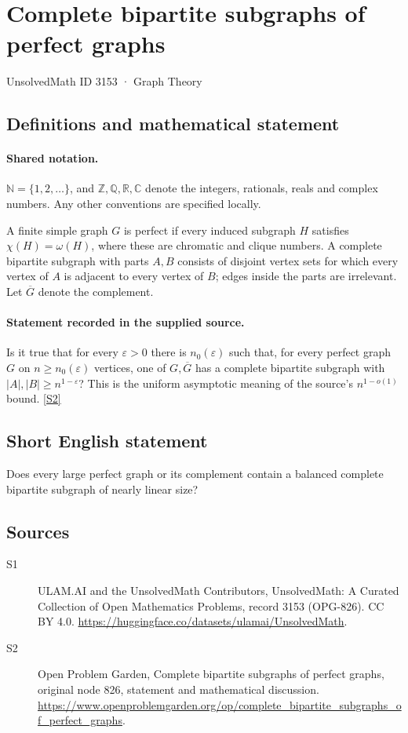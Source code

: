 \documentclass[11pt]{article}
\newcommand{\sref}[2]{\hyperlink{source:#1:#2}{[S#2]}}
\begin{document}
\setcounter{section}{3152}
\section{Complete bipartite subgraphs of perfect graphs}\label{3153}
{\small\sffamily UnsolvedMath ID 3153 · Graph Theory}
\subsection{Definitions and mathematical statement}

\paragraph{Shared notation.}$\mathbb N=\{1,2,\ldots\}$, and $\mathbb Z,\mathbb Q,\mathbb R,\mathbb C$ denote the integers, rationals, reals and complex numbers. Any other conventions are specified locally.


A finite simple graph $G$ is perfect if every induced subgraph $H$ satisfies $\chi(H)=\omega(H)$, where these are chromatic and clique numbers. A complete bipartite subgraph with parts $A,B$ consists of disjoint vertex sets for which every vertex of $A$ is adjacent to every vertex of $B$; edges inside the parts are irrelevant. Let $\overline G$ denote the complement.
\paragraph{Statement recorded in the supplied source.}
Is it true that for every $\varepsilon>0$ there is $n_0(\varepsilon)$ such that, for every perfect graph $G$ on $n\ge n_0(\varepsilon)$ vertices, one of $G,\overline G$ has a complete bipartite subgraph with $|A|,|B|\ge n^{1-\varepsilon}$? This is the uniform asymptotic meaning of the source's $n^{1-o(1)}$ bound. \sref{3153}{2}
\subsection{Short English statement}
Does every large perfect graph or its complement contain a balanced complete bipartite subgraph of nearly linear size?
\subsection{Sources}
\begin{description}
\item[\hypertarget{source:3153:1}{S1}] ULAM.AI and the UnsolvedMath Contributors, UnsolvedMath: A Curated Collection of Open Mathematics Problems, record 3153 (OPG-826). CC BY 4.0. \url{https://huggingface.co/datasets/ulamai/UnsolvedMath}.
\item[\hypertarget{source:3153:2}{S2}] Open Problem Garden, Complete bipartite subgraphs of perfect graphs, original node 826, statement and mathematical discussion. \url{https://www.openproblemgarden.org/op/complete_bipartite_subgraphs_of_perfect_graphs}.
\end{description}
\label{end:3153}
\end{document}
